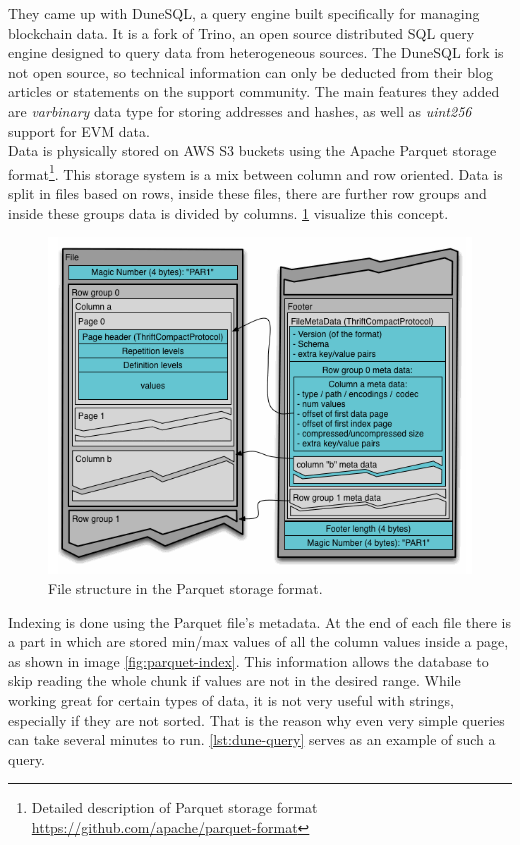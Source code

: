 They came up with DuneSQL, a query engine built specifically for managing blockchain data. It is a fork of Trino, an open source distributed SQL query engine designed to query data from heterogeneous sources. The DuneSQL fork is not open source, so technical information can only be deducted from their blog articles or statements on the support community. The main features they added are \textit{varbinary} data type for storing addresses and hashes, as well as \textit{uint256} support for EVM data. \\

Data is physically stored on AWS S3 buckets using the Apache Parquet storage format\footnote{Detailed description of Parquet storage format \url{https://github.com/apache/parquet-format}}. This storage system is a mix between column and row oriented. Data is split in files based on rows, inside these files, there are further row groups and inside these groups data is divided by columns. \cref{fig:parquet-structure} visualize this concept. \\

\begin{figure}[H]
  \centering
  \includegraphics[width=1\textwidth]{Figures/parquet-structure.png}
  \caption[Parquet storage format structure]{File structure in the Parquet storage format\protect\footnotemark.}
  \label{fig:parquet-structure}
\end{figure}


Indexing is done using the Parquet file's metadata. At the end of each file there is a part in which are stored min/max values of all the column values inside a page, as shown in image \ref{fig:parquet-index}. This information allows the database to skip reading the whole chunk if values are not in the desired range. While working great for certain types of data, it is not very useful with strings, especially if they are not sorted. That is the reason why even very simple queries can take several minutes to run. \cref{lst:dune-query} serves as an example of such a query. \\

